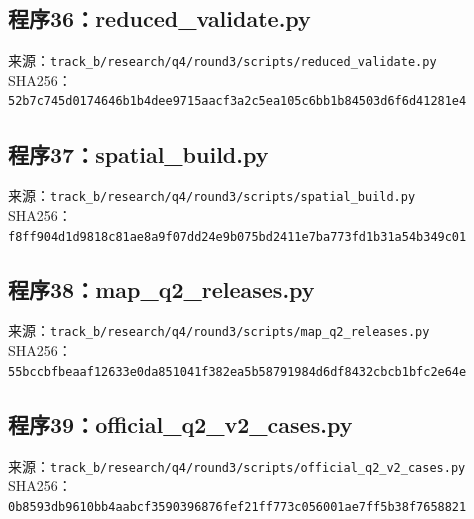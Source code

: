 \subsection*{程序36：reduced\_validate.py}
\noindent 来源：\nolinkurl{track_b/research/q4/round3/scripts/reduced_validate.py}\\
\noindent SHA256：\texttt{52b7c745d0174646b1b4dee9715aacf3}\allowbreak\texttt{a2c5ea105c6bb1b84503d6f6d41281e4}\\
\clearpage
\subsection*{程序37：spatial\_build.py}
\noindent 来源：\nolinkurl{track_b/research/q4/round3/scripts/spatial_build.py}\\
\noindent SHA256：\texttt{f8ff904d1d9818c81ae8a9f07dd24e9b}\allowbreak\texttt{075bd2411e7ba773fd1b31a54b349c01}\\
\clearpage
\subsection*{程序38：map\_q2\_releases.py}
\noindent 来源：\nolinkurl{track_b/research/q4/round3/scripts/map_q2_releases.py}\\
\noindent SHA256：\texttt{55bccbfbeaaf12633e0da851041f382e}\allowbreak\texttt{a5b58791984d6df8432cbcb1bfc2e64e}\\
\clearpage
\subsection*{程序39：official\_q2\_v2\_cases.py}
\noindent 来源：\nolinkurl{track_b/research/q4/round3/scripts/official_q2_v2_cases.py}\\
\noindent SHA256：\texttt{0b8593db9610bb4aabcf3590396876fe}\allowbreak\texttt{f21ff773c056001ae7ff5b38f7658821}\\
\clearpage
